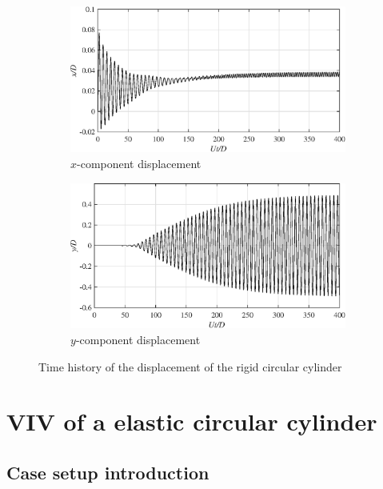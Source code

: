 \begin{figure}[H]
\centering
    \begin{subfigure}[b]{0.6\linewidth}
        \includegraphics[width=\linewidth]{images/xdisp1.eps}
        \caption{$x$-component displacement}
     \end{subfigure}
    \begin{subfigure}[b]{0.6\linewidth}
        \includegraphics[width=\linewidth]{images/ydisp1.eps}
        \caption{$y$-component displacement}
    \end{subfigure}
      \caption{Time history of the displacement of the rigid circular cylinder}\label{results1}
\end{figure}

\section{VIV of a elastic circular cylinder}

\subsection{Case setup introduction}

